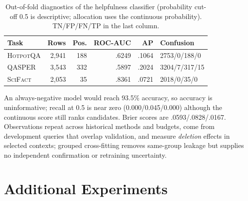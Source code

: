 \documentclass[10pt,twocolumn,letterpaper]{article}
\newcommand{\hotpot}{\textsc{HotpotQA}\xspace}
\newcommand{\qasper}{\textsc{QASPER}\xspace}
\newcommand{\scifact}{\textsc{SciFact}\xspace}
\begin{document}
\begin{table}[H]\centering\small\setlength{\tabcolsep}{5pt}
\caption{Out-of-fold diagnostics of the helpfulness classifier (probability cut-off 0.5 is descriptive; allocation uses the continuous probability). TN/FP/FN/TP in the last column.}\label{tab:cls}
\begin{tabular}{lrrrrl}\toprule
Task & Rows & Pos. & ROC-AUC & AP & Confusion\\\midrule
\hotpot & 2,941 & 188 & .6249 & .1064 & 2753/0/188/0\\
\qasper & 3,543 & 332 & .5897 & .2024 & 3204/7/317/15\\
\scifact & 2,053 & 35 & .8361 & .0721 & 2018/0/35/0\\\bottomrule
\end{tabular}\end{table}
An always-negative model would reach 93.5\% accuracy, so accuracy is uninformative; recall at 0.5 is near zero (0.000/0.045/0.000) although the continuous score still ranks candidates. Brier scores are .0593/.0828/.0167. Observations repeat across historical methods and budgets, come from development queries that overlap validation, and measure \emph{deletion} effects in selected contexts; grouped cross-fitting removes same-group leakage but supplies no independent confirmation or retraining uncertainty.

\section{Additional Experiments}\label{app:early}
\end{document}
